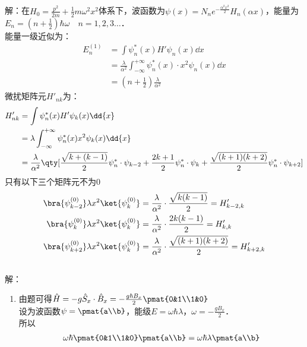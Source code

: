 \subsection{ }
解：在$H_0=\frac{p^2}{2m}+\frac{1}{2}m\omega^2x^2$体系下，波函数为$\psi(x)=N_ne^{-\frac{\alpha^2x^2}{2}}H_n(\alpha x) $，能量为$E_n=(n+\frac{1}{2})\hbar\omega \quad n=1,2,3\dots$．\\
能量一级近似为：
\begin{equation}
\begin{aligned}
E^{(1)}_n&=\int \psi^*_n(x)H'\psi_n(x)\dd{x} \\
&=\frac{\lambda}{\alpha^2}\int^{+\infty}_{-\infty}\psi^*_n(x)\cdot x^2\psi_n(x)\dd{x} \\
&=(n+\frac{1}{2})\frac{\lambda}{\alpha^2}
\end{aligned}
\end{equation}
微扰矩阵元$H'_{nk}$为：
\begin{equation}
\begin{aligned}
H'_{nk}&=\int\psi^*_n(x)H'\psi_k(x)\dd{x}\\
&=\lambda\int^{+\infty}_{-\infty}\psi^*_n(x)x^2\psi_k(x)\dd{x}\\
&=\frac{\lambda}{\alpha^2}\qty[\frac{\sqrt{k+(k-1)}}{2}\psi^*_n\cdot\psi_{k-2}+\frac{2k+1}{2}\psi^*_n\cdot\psi_k+\frac{\sqrt{(k+1)(k+2)}}{2}\psi^*_n\cdot\psi_{k+2}]
\end{aligned}
\end{equation}
只有以下三个矩阵元不为0
\begin{equation}
\begin{aligned}
\bra{\psi^{(0)}_{k-2}}\lambda x^2\ket{\psi^{(0)}_k}&=\frac{\lambda}{\alpha^2}\cdot\frac{\sqrt{k(k-1)}}{2}=H'_{k-2,k}\\
\bra{\psi^{(0)}_{k}}\lambda x^2\ket{\psi^{(0)}_k}&=\frac{\lambda}{\alpha^2}\cdot\frac{2k(k-1)}{2}=H'_{k,k}\\
\bra{\psi^{(0)}_{k+2}}\lambda x^2\ket{\psi^{(0)}_k}&=\frac{\lambda}{\alpha^2}\cdot\frac{\sqrt{(k+1)(k+2)}}{2}=H'_{k+2,k}
\end{aligned}
\end{equation}
\subsection{ }
解：
\begin{enumerate}
\item 由题可得$\hat{H}=-g\hat{S}_x\cdot\hat{B}_x=-\frac{g\hbar B_x}{2}\pmat{0&1\\1&0} $\\
设为波函数$\psi=\pmat{a\\b}$，能级$E=\omega\hbar\lambda$，$\omega=-\frac{gB_x}{2}$．\\
所以
\begin{equation}
\begin{aligned}
\omega\hbar\pmat{0&1\\1&0}\pmat{a\\b}=\omega\hbar\lambda\pmat{a\\b}
\end{aligned}
\end{equation}

\end{enumerate}